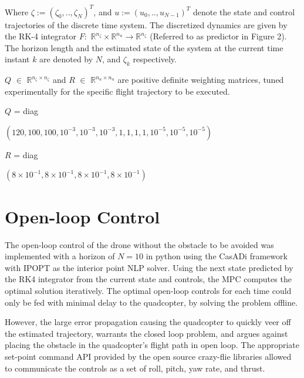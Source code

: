 \documentclass[conference]{IEEEtran}
\begin{document}
Where $\zeta := (\zeta_0, .., \zeta_N)^T$, and $u := (u_0, .., u_{N-1})^T$ denote the state and control trajectories of the discrete time system. The discretized dynamics are given by the RK-4 integrator $F :$ $\mathbb{R}^{n_{\zeta}} \times \mathbb{R}^{n_{u}} \rightarrow \mathbb{R}^{n_{\zeta}}$ (Referred to as predictor in Figure 2). The horizon length and the estimated state of the system at the current time instant $k$ are denoted by $N$, and $\zeta_k$ respectively.

 $Q$ $\in$ $\mathbb{R}^{n_{\zeta} \times n_{\zeta}}$ and $R$ $\in$ $\mathbb{R}^{n_{u} \times n_{u}}$ are positive definite weighting matrices, tuned experimentally for the specific flight trajectory to be executed.
\begin{flushleft}
\begin{small}
$Q$ = diag\begin{footnotesize}$(120, 100, 100, 10^{-3}, 10^{-3},10^{-3},1, 1, 1, 1, 10^{-5}, 10^{-5}, 10^{-5})$\\
\end{footnotesize}
$R$ = diag\begin{footnotesize}$(8 \times 10^{-1}, 8\times 10^{-1}, 8\times 10^{-1}, 8\times 10^{-1})$\\
\end{footnotesize}
\end{small}
\end{flushleft}

\section{Open-loop Control }\label{Section4}
The open-loop control of the drone without the obstacle to be avoided was implemented with a horizon of $N = 10$ in python using the CasADi \cite{andersson_casadi_2019} framework with IPOPT \cite{wachter_implementation_2006} as the interior point NLP solver. Using the next state predicted by the RK4 integrator from the current state and controls, the MPC computes the optimal solution iteratively. The optimal open-loop controls for each time could only be fed with minimal delay to the quadcopter, by solving the problem offline. 


However, the large error propagation causing the quadcopter to quickly veer off the estimated trajectory, warrants the closed loop problem, and argues against placing the obstacle in the quadcopter's flight path in open loop.
The appropriate set-point command API provided by the open source crazy-flie libraries allowed to communicate the controls as a set of roll, pitch, yaw rate, and thrust. 
\end{document}
